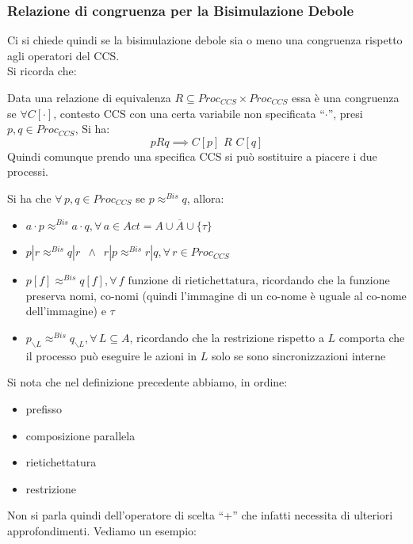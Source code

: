 \subsubsection{Relazione di congruenza per la Bisimulazione Debole}
Ci si chiede quindi se la bisimulazione debole sia o meno una congruenza
rispetto agli operatori del CCS.\\
Si ricorda che:
\begin{definizione}
  Data una relazione di equivalenza $R\subseteq Proc_{CCS}\times Proc_{CCS}$
  essa è una congruenza se $\forall C[\cdot]$, contesto CCS con una certa
  variabile non specificata ``$\cdot$'', presi $p, q\in Proc_{CCS}$, Si ha:
  \[pRq\implies C[p]\,\, R\,\, C[q]\]
  Quindi comunque prendo una specifica CCS si può sostituire a piacere i due
  processi. 
\end{definizione}
\begin{definizione}
  Si ha che $\forall\, p, q\in Proc_{CCS}$ se $p\approx^{Bis}q$, allora:
  \begin{itemize}
    \item $a\cdot p\approx^{Bis} a\cdot q,\forall\, a\in
    Act=A\cup\overline{A}\cup\{\tau\}$ 
    \item $p|r\approx^{Bis}q|r\,\,\,\land \,\,\,
    r|p\approx^{Bis}r|q,\forall\, r\in Proc_{CCS}$  
    \item $p[f]\approx^{Bis}q[f],\forall\, f\mbox{ funzione di rietichettatura}$,
    ricordando che la funzione preserva nomi, co-nomi (quindi l'immagine di un
    co-nome è uguale al co-nome dell'immagine) e $\tau$
    \item $p_{\backslash L}\approx^{Bis}q_{\backslash L},\forall\, L\subseteq A$,
    ricordando che la restrizione rispetto a $L$ comporta che il processo può
    eseguire le azioni in $L$ solo se sono sincronizzazioni interne
  \end{itemize}
\end{definizione}
Si nota che nel definizione precedente abbiamo, in ordine:
\begin{itemize}
  \item prefisso
  \item composizione parallela
  \item rietichettatura
  \item restrizione
\end{itemize}
Non si parla quindi dell'operatore di scelta ``+'' che infatti necessita di
ulteriori approfondimenti. Vediamo un esempio:
